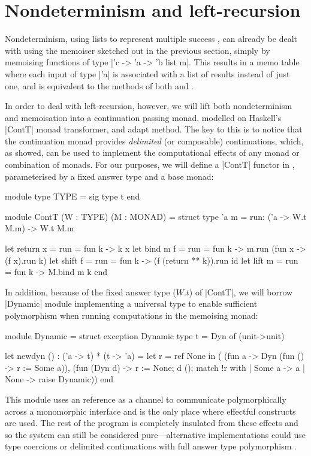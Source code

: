 \section{Nondeterminism and left-recursion}
\label{s:contmemo}

Nondeterminism, using lists to represent multiple success \cite{Wadler1985},
can already be dealt with using the memoiser sketched out in the previous section,
simply by memoising functions of type |'c -> 'a -> 'b list m|. This
results in a memo table where each input of type |'a| is associated with
a list of results instead of just one, and is equivalent to the methods
of both \citet{Norvig1991} and \citet{Frost1994}.

In order to deal with left-recursion, however,
we will lift both nondeterminism and memoisation into a continuation passing monad, 
modelled on Haskell's |ContT| monad transformer, and adapt  method.
The key to this is to notice that the continuation monad provides
\emph{delimited} (or composable) continuations, which, as \citet{Filinski1994,Filinski1999} showed,
can be used to implement the computational effects of any monad or 
combination of monads. For our purposes, we will define a |ContT| functor in
\OCaml, parameterised by a fixed 
answer type and a base monad:
\begin{ocaml}
	module type TYPE = sig type t end

	module ContT (W : TYPE) (M : MONAD) = struct
		type 'a m = {{run: ('a -> W.t M.m) -> W.t M.m}}

		let return x = {{run = fun k -> k x}}
		let bind m f = {{run = fun k -> m.run (fun x -> (f x).run k)}}
		let shift f  = {{run = fun k -> (f (return ** k)).run id}}
		let lift m   = {{run = fun k -> M.bind m k}}
	end
\end{ocaml}
In addition, because of the fixed answer type ($W.t$) of |ContT|,
we will borrow  |Dynamic| module implementing
a universal type to enable sufficient polymorphism when running computations
in the memoising monad:
\begin{ocaml}
	module Dynamic = struct 
		exception Dynamic
		type t = Dyn of (unit->unit)

		let newdyn () : ('a -> t) * (t -> 'a) = 
			let r = ref None in
			( (fun a -> Dyn (fun () -> r := Some a)),
				(fun (Dyn d) -> r := None; d (); 
					              match !r with
					              | Some a -> a
					              | None -> raise Dynamic))
	end
\end{ocaml}
This module uses an \OCaml reference as a channel to communicate polymorphically
across a monomorphic interface and is the only place where effectful 
\OCaml constructs are used. The rest of the program is completely insulated
from these effects and so the system can still be considered pure---alternative
implementations could use type coercions or delimited
continuations with full answer type polymorphism \cite{AsaiKameyama2007}.

